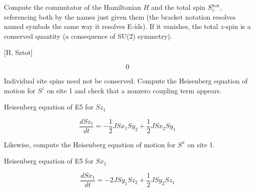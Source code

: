 \documentclass[dvipdfmx]{article}
\begin{document}
Compute the commutator of the Hamiltonian $H$ and the total spin $S_z^{\rm tot}$, referencing both by the names just given them (the bracket notation resolves named symbols the same way it resolves E-ids). If it vanishes, the total $z$-spin is a conserved quantity (a consequence of SU(2) symmetry).

[H, Sztot]

\begin{equation}
  0
  \label{eq:E7}
\end{equation}

Individual site spins need not be conserved. Compute the Heisenberg equation of motion for $S^z$ on site 1 and check that a nonzero coupling term appears.

Heisenberg equation of E5 for $Sz_1$

\begin{equation}
  \frac{d Sz_1}{d t} = - \frac{1}{2} J Sx_1 Sy_2 + \frac{1}{2} J Sx_2 Sy_1
  \label{eq:E8}
\end{equation}

Likewise, compute the Heisenberg equation of motion for $S^x$ on site 1.

Heisenberg equation of E5 for $Sx_1$

\begin{equation}
  \frac{d Sx_1}{d t} = - 2 J Sy_1 Sz_2 + \frac{1}{2} J Sy_2 Sz_1
  \label{eq:E9}
\end{equation}
\end{document}
